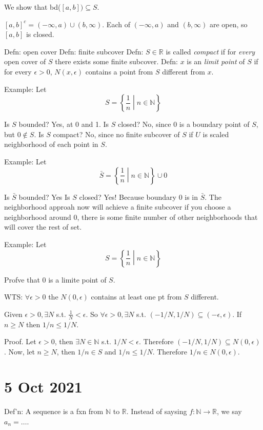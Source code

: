 \documentclass{report}
\begin{document}
We show that bd($[a, b]) \subseteq S$. 

$[a, b]^c = (-\infty, a) \cup (b, \infty)$. Each of $(-\infty, a)$ and $(b, \infty)$ are open, so $[a, b]$ is closed. 

Defn: open cover
Defn: finite subcover
Defn: $S \in \mathbb{R}$ is called \emph{compact} if for \emph{every} open cover of $S$ there exists some finite subcover. 
Defn: $x$ is an \emph{limit point} of $S$ if for every $\epsilon > 0$, $N(x, \epsilon)$ contains a point from $S$ different from $x$. 

Example: Let 
\[
        S = \left\{\frac{1}{n}\middle| n \in \mathbb{N}\right\}
\]

Is $S$ bounded? Yes, at 0 and 1. 
Is $S$ closed? No, since 0 is a boundary point of $S$, but $0 \notin S$. 
Is $S$ compact? No, since no finite subcover of $S$ if $U$ is scaled neighborhood of each point in $S$. 

Example: Let 
\[
        \bar{S} = \left\{\frac{1}{n}\middle| n \in \mathbb{N}\right\} \cup {0}
\]

Is $\bar{S}$ bounded? Yes
Is $S$ closed? Yes! Because boundary 0 is in $\bar{S}$. 
The neighborhood approah now will achieve a finite subcover if you choose a neighborhood around 0, there is some finite number of other neighborhoods that will cover the rest of set. 

Example: Let 
\[
        S = \left\{\frac{1}{n} \middle| n\in \mathbb{N}\right\}
\]

Profve that 0 is a limite point of $S$. 

WTS: $\forall \epsilon > 0$ the $N(0, \epsilon)$ contains at least one pt from $S$ different. 

Given $\epsilon > 0, \exists N$ s.t. $\frac{1}{N} < \epsilon$.
So $\forall \epsilon >0, \exists N$ s.t. $(-1/N, 1/N) \subseteq (-\epsilon, \epsilon)$. If $n \geq N$ then $1/n \leq 1/N$. 

Proof. Let $\epsilon > 0$, then $\exists N \in \mathbb{N}$ s.t. $1/N < \epsilon$. 
Therefore $(-1/N, 1/N) \subseteq N(0, \epsilon)$. 
Now, let $n\geq N$, then $1/n \in S$ and $1/n \leq 1/N$. Therefore $1/n \in N(0, \epsilon)$. 

\section*{5 Oct 2021}

Def'n: A sequence is a fxn from $\mathbb{N}$ to $\mathbb{R}$. 
Instead of saysing $f: \mathbb{N} \rightarrow \mathbb{R}$, we say $a_n = \dots$. 
\end{document}
